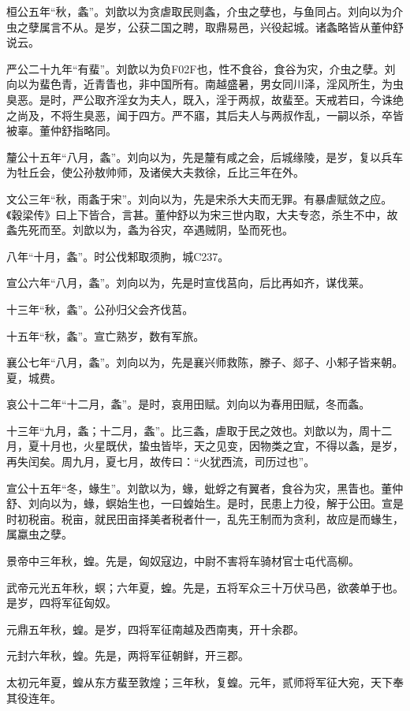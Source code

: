 \documentclass[]{article}
\begin{document}
桓公五年``秋，螽''。刘歆以为贪虐取民则螽，介虫之孽也，与鱼同占。刘向以为介虫之孽属言不从。是岁，公获二国之聘，取鼎易邑，兴役起城。诸螽略皆从董仲舒说云。

严公二十九年``有蜚''。刘歆以为负F02F也，性不食谷，食谷为灾，介虫之孽。刘向以为蜚色青，近青眚也，非中国所有。南越盛暑，男女同川泽，淫风所生，为虫臭恶。是时，严公取齐淫女为夫人，既入，淫于两叔，故蜚至。天戒若曰，今诛绝之尚及，不将生臭恶，闻于四方。严不寤，其后夫人与两叔作乱，一嗣以杀，卒皆被辜。董仲舒指略同。

釐公十五年``八月，螽''。刘向以为，先是釐有咸之会，后城缘陵，是岁，复以兵车为牡丘会，使公孙敖帅师，及诸侯大夫救徐，丘比三年在外。

文公三年``秋，雨螽于宋''。刘向以为，先是宋杀大夫而无罪。有暴虐赋敛之应。《穀梁传》曰上下皆合，言甚。董仲舒以为宋三世内取，大夫专恣，杀生不中，故螽先死而至。刘歆以为，螽为谷灾，卒遇贼阴，坠而死也。

八年``十月，螽''。时公伐邾取须朐，城C237。

宣公六年``八月，螽''。刘向以为，先是时宣伐莒向，后比再如齐，谋伐莱。

十三年``秋，螽''。公孙归父会齐伐莒。

十五年``秋，螽''。宣亡熟岁，数有军旅。

襄公七年``八月，螽''。刘向以为，先是襄兴师救陈，滕子、郯子、小邾子皆来朝。夏，城费。

哀公十二年``十二月，螽''。是时，哀用田赋。刘向以为春用田赋，冬而螽。

十三年``九月，螽；十二月，螽''。比三螽，虐取于民之效也。刘歆以为，周十二月，夏十月也，火星既伏，蛰虫皆毕，天之见变，因物类之宜，不得以螽，是岁，再失闰矣。周九月，夏七月，故传曰：``火犹西流，司历过也''。

宣公十五年``冬，蝝生''。刘歆以为，蝝，蚍蜉之有翼者，食谷为灾，黑眚也。董仲舒、刘向以为，蝝，螟始生也，一曰蝗始生。是时，民患上力役，解于公田。宣是时初税亩。税亩，就民田亩择美者税者什一，乱先王制而为贪利，故应是而蝝生，属蠃虫之孽。

景帝中三年秋，蝗。先是，匈奴寇边，中尉不害将车骑材官士屯代高柳。

武帝元光五年秋，螟；六年夏，蝗。先是，五将军众三十万伏马邑，欲袭单于也。是岁，四将军征匈奴。

元鼎五年秋，蝗。是岁，四将军征南越及西南夷，开十余郡。

元封六年秋，蝗。先是，两将军征朝鲜，开三郡。

太初元年夏，蝗从东方蜚至敦煌；三年秋，复蝗。元年，贰师将军征大宛，天下奉其役连年。
\end{document}
